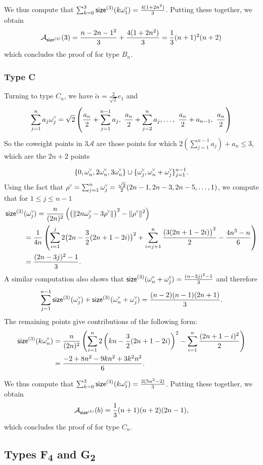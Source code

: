 \documentclass[ALCO,published]{cedram}
\newcommand{\chk}[1]{#1^{\normalfont\smash{\scalebox{.5}[.5]{\rotatebox{90}{\textbf{\textless}}}}}}
\newcommand{\ac}{\mathcal{A}}
\newcommand{\cw}{\chk{\omega}}
\newcommand{\size}{{\sf size}}
\newcommand{\sizeb}{\size^{(b)}}
\begin{document}
We thus compute that $\sum_{k=0}^3 \size^{(3)}(k\cw_1)= \frac{4(1 + 2 n^2)}{3}$. Putting these together, we obtain 
$$ \ac_{\size^{(3)}}(3) = \frac{{n-2}{n-1}^2}{3} + \frac{4(1+2n^2)}{3} = \frac{1}{3}(n+1)^2(n+2) $$
which concludes the proof of  for type $B_n$.


\subsubsection{Type C}
\label{sec:type_c_calc}
Turning to type $C_n$, we have $\widetilde{\alpha}=\frac{2}{\sqrt{2}}e_1$ and
$$\sum_{j=1}^n a_j \cw_j = \sqrt{2}\left(\frac{a_n}{2}+\sum_{j=1}^{n-1} a_j,~\frac{a_n}{2}+\sum_{j=2}^n a_j,\ldots,~\frac{a_n}{2}+a_{n-1},~\frac{a_n}{2}\right)$$
So the coweight points in $3\ac$ are those points for which $2(\sum_{j=1}^{n-1} a_j)+a_n \leq 3$, which are the $2n+2$ points

\[\{0,\cw_n,2\cw_n,3\cw_n\}\cup \{\cw_j,\cw_n+\cw_j\}_{j=1}^{n-1}.\]
Using the fact that $\chk{\rho}=\sum_{j=1}^n \cw_j = \frac{\sqrt{2}}{2}(2n-1,2n-3,2n-5,\ldots,1)$, we compute that for $1 \leq j \leq n-1$
\begin{align*}
\size^{(3)}&(\cw_j) = \frac{n}{(2n)^2}\left( \left(\|2n\cw_j-3\chk{\rho}\|\right)^2-\|\chk{\rho}\|^2\right) \\ &=
\frac{1}{4n}\left( \sum_{i=1}^j 2\big(2n-\frac{3}{2}(2n+1-2i)\big)^2+\sum_{i=j+1}^n \frac{(3(2n+1-2i)\big)^2}{2} -\frac{4n^3-n}{6}\right) \\ 
 &= \frac{(2n-3j)^2-1}{3}.
\end{align*}
A similar computation also shows that $\size^{(3)}(\cw_n+\cw_j) = \frac{(n-3j)^2-1}{3}$ and therefore
\[\sum_{j=1}^{n-1} \size^{(3)}(\cw_j)+\size^{(3)}(\cw_n+\cw_j) = \frac{(n-2) (n-1)(2n+1)}{3}.\]
The remaining points give contributions of the following form:
\begin{align*}
\size^{(3)}(k\cw_n) &= \frac{n}{(2 n)^2} \left(
     \sum_{i=1}^n 2 \left(kn-\frac{3}{2}(2n+1-2i)\right)^2 -\sum_{i=1}^n \frac{(2n+1-i)^2}{2} \right) \\
    &=\frac{-2+8 n^2-9 k n^2+3 k^2 n^2}{6}.
\end{align*}

We thus compute that $\sum_{k=0}^3 \size^{(3)}(k\cw_1)  = \frac{2(5n^2-2)}{3}$. Putting these together, we obtain
$$ \ac_{\sizeb}(b) = \frac{1}{3}(n+1)(n+2)(2n-1),$$
which concludes the proof of  for type $C_n$.


\subsection{Types F\texorpdfstring{\textsubscript{4}}{4} and G\texorpdfstring{\textsubscript{2}}{2}}
\label{sec:type_fg_calc}
\end{document}
